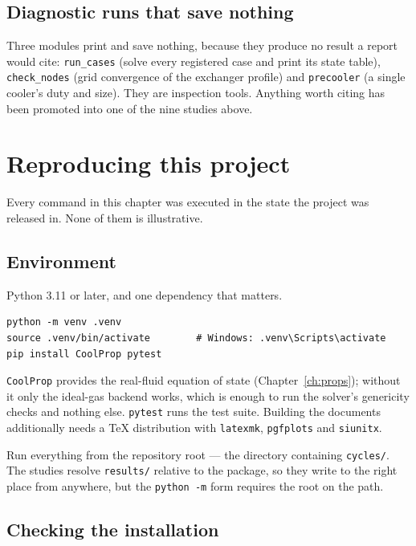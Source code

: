 \documentclass[11pt,a4paper]{report}
\newcommand{\code}[1]{\texttt{\small #1}}
\begin{document}
\section{Diagnostic runs that save nothing}

Three modules print and save nothing, because they produce no result a
report would cite: \code{run\_cases} (solve every registered case and
print its state table), \code{check\_nodes} (grid convergence of the
exchanger profile) and \code{precooler} (a single cooler's duty and
size). They are inspection tools. Anything worth citing has been
promoted into one of the nine studies above.

\chapter{Reproducing this project}
\label{ch:reproduce}

Every command in this chapter was executed in the state the project was
released in. None of them is illustrative.

\section{Environment}

Python 3.11 or later, and one dependency that matters.

\begin{verbatim}
python -m venv .venv
source .venv/bin/activate        # Windows: .venv\Scripts\activate
pip install CoolProp pytest
\end{verbatim}

\code{CoolProp} provides the real-fluid equation of state
(Chapter~\ref{ch:props}); without it only the ideal-gas backend works,
which is enough to run the solver's genericity checks and nothing else.
\code{pytest} runs the test suite. Building the documents additionally
needs a \TeX{} distribution with \code{latexmk}, \code{pgfplots} and
\code{siunitx}.

Run everything from the repository root --- the directory containing
\code{cycles/}. The studies resolve \code{results/} relative to the
package, so they write to the right place from anywhere, but the
\code{python -m} form requires the root on the path.

\section{Checking the installation}
\end{document}
